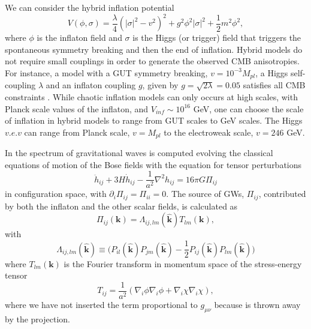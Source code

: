 \documentclass[11pt,a4paper,twoside]{book}
\begin{document}
We can consider  the hybrid inflation potential
\begin{equation}
\label{Chap7:HybridPotential}
V(\phi,\sigma)=\frac{\lambda}{4}(|\sigma|^{2}-v^{2})^{2} +  g^{2}\phi^{2}|\sigma|^{2} + \frac{1}{2}m^{2}\phi^{2},
\end{equation}
where $ \phi $ is the inflaton field and $\sigma$ is the Higgs (or trigger) field that triggers the spontaneous symmetry breaking and then the end of inflation. Hybrid models do not require small couplings in order to generate the observed CMB anisotropies. For instance, a model with a GUT symmetry breaking, $ v=10^{-3}M_{pl} $, a Higgs self-coupling $\lambda$ and an inflaton coupling $ g $, given by $ g=\sqrt{2\lambda}=0.05 $ satisfies all CMB constraints \cite{Chap7:HybridModel}. While chaotic inflation models can only occurs at high scales, with Planck scale values of the inflaton, and $ V_{inf} \sim 10^{16} $ GeV, one can choose the scale of inflation in hybrid models to range from GUT scales to GeV scales. The Higgs $ v.e.v $ can range from Planck scale, $ v=M_{pl} $ to the electroweak scale, $ v=246 $ GeV.

In \cite{Chap7:HybridModel} the spectrum of gravitational waves is computed evolving the classical equations of motion of the Bose fields with the equation for tensor perturbations
\begin{equation}
\label{HybridModelsTensorPerturbations}
\ddot{h}_{ij} + 3H\dot{h}_{ij}-\frac{1}{a^{2}}\nabla^{2}h_{ij}=16\pi G \Pi_{ij}
\end{equation}
in configuration space, with $ \partial_{i}\Pi_{ij}=\Pi_{ii}=0 $. The source of GWs, $\Pi_{ij}$, contributed by both the inflaton and the other scalar fields, is calculated as 
\begin{equation}
	\label{Chap7:HybridModels_SourceGWs}
	\Pi_{ij}(\textbf{k})=\Lambda_{ij,lm}(\hat{\textbf{k}})T_{lm}(\textbf{k}),
\end{equation}
with
\begin{equation}
	\label{Chap7:HybridModels_ProjectorLmabda}
	\Lambda_{ij,lm}(\hat{\textbf{k}}) \equiv \Bigg(P_{il}(\hat{\textbf{k}})P_{jm}(\hat{\textbf{k}}) - \frac{1}{2}P_{ij}(\hat{\textbf{k}})P_{lm}(\hat{\textbf{k}})\Bigg)
\end{equation}
where $ T_{lm}(\textbf{k}) $ is the Fourier transform in momentum space of the stress-energy tensor
\begin{equation}
\label{Chap7:HybridModels_StressEnergyTensor}
T_{ij}=\frac{1}{a^{2}}(\nabla_{i}\phi\nabla_{i}\phi + \nabla_{i}\chi\nabla_{i}\chi ),
\end{equation}
where we have not inserted the term proportional to $ g_{\mu\nu} $ because is thrown away by the projection. 
\end{document}

